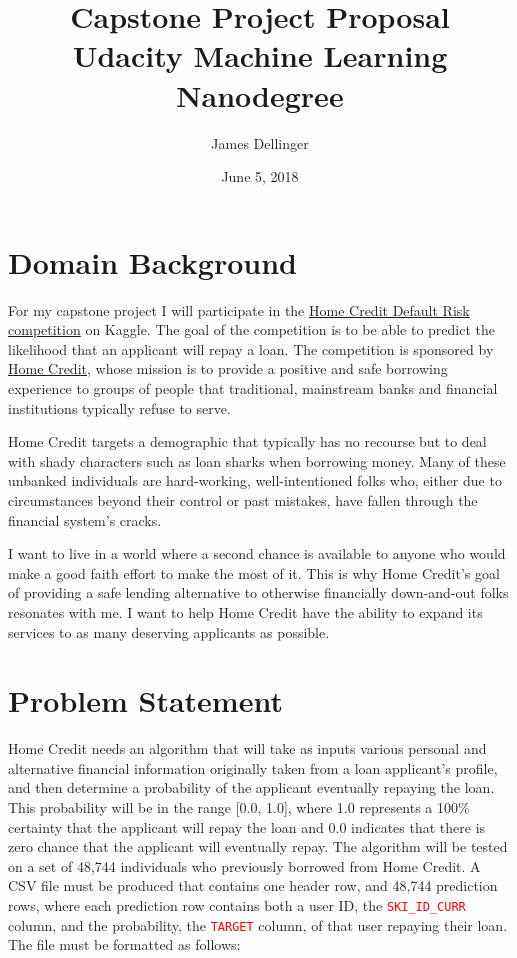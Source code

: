 \documentclass[12pt, letterpaper]{article}
\title{Capstone Project Proposal\\[8pt]
\normalsize{Udacity Machine Learning Nanodegree}}
\date{June 5, 2018}
\author{James Dellinger}
\begin{document}
\maketitle

\section{Domain Background}
For my capstone project I will participate in the \href{https://www.kaggle.com/c/home-credit-default-risk}{Home Credit Default Risk competition} on Kaggle\cite{kagglehomecreditcompetitionoverview}. The goal of the competition is to be able to predict the likelihood that an applicant will repay a loan. The competition is sponsored by \href{http://www.homecredit.net}{Home Credit}\cite{homecreditwebsite}, whose mission is to provide a positive and safe borrowing experience to groups of people that traditional, mainstream banks and financial institutions typically refuse to serve.

Home Credit targets a demographic that typically has no recourse but to deal with shady characters such as loan sharks when borrowing money. Many of these unbanked individuals are hard-working, well-intentioned folks who, either due to circumstances beyond their control or past mistakes, have fallen through the financial system’s cracks.

I want to live in a world where a second chance is available to anyone who would make a good faith effort to make the most of it. This is why Home Credit’s goal of providing a safe lending alternative to otherwise financially down-and-out folks resonates with me. I want to help Home Credit have the ability to expand its services to as many deserving applicants as possible.

\section{Problem Statement}
\label{problemstatement}
Home Credit needs an algorithm that will take as inputs various personal and alternative financial information originally taken from a loan applicant's profile, and then determine a probability of the applicant eventually repaying the loan. This probability will be in the range [0.0, 1.0], where 1.0 represents a 100\% certainty that the applicant will repay the loan and 0.0 indicates that there is zero chance that the applicant will eventually repay. The algorithm will be tested on a set of 48,744 individuals who previously borrowed from Home Credit. A CSV file must be produced that contains one header row, and 48,744 prediction rows, where each prediction row contains both a user ID, the \colorbox{backcolor}{\textcolor{red}{\texttt{SKI_ID_CURR}}} column, and the probability, the \colorbox{backcolor}{\textcolor{red}{\texttt{TARGET}}} column, of that user repaying their loan. The file must be formatted as follows:
\end{document}
